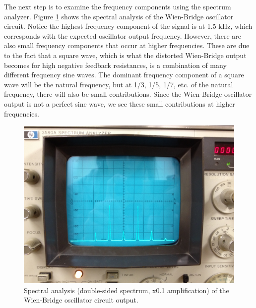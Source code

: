 \documentclass[12pt,letterpaper]{report}
\newlength \figwidth
\begin{document}
The next step is to examine the frequency components using the spectrum analyzer. Figure \ref{fig:circuit_spec} shows the spectral analysis of the Wien-Bridge oscillator circuit. Notice the highest frequency component of the signal is at 1.5 kHz, which corresponds with the expected oscillator output frequency. However, there are also small frequency components that occur at higher frequencies. These are due to the fact that a square wave, which is what the distorted Wien-Bridge output becomes for high negative feedback resistances, is a combination of many different frequency sine waves. The dominant frequency component of a square wave will be the natural frequency, but at 1/3, 1/5, 1/7, etc. of the natural frequency, there will also be small contributions. Since the Wien-Bridge oscillator output is not a perfect sine wave, we see these small contributions at higher frequencies.

\begin{figure}[H]
\centering
\includegraphics[width=\figwidth, keepaspectratio=true]{lab9_images/circuit_spec.jpg}
\caption{Spectral analysis (double-sided spectrum, x0.1 amplification) of the Wien-Bridge oscillator circuit output.}
\label{fig:circuit_spec}
\end{figure}
\end{document}
